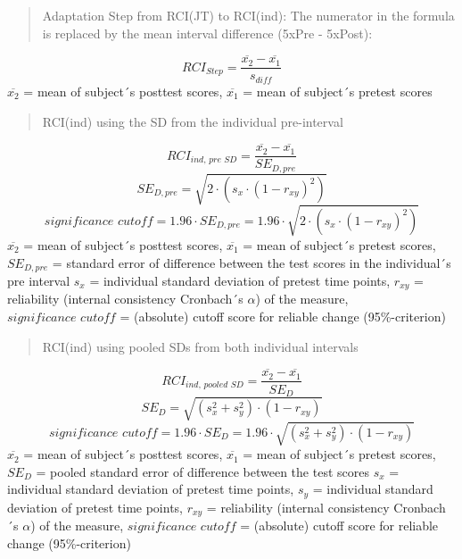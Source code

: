 \documentclass[12pt,twoside]{reedthesis}
\begin{document}
\par
\begin{quote}
Adaptation Step from RCI(JT) to RCI(ind): The numerator in the formula is replaced by the mean interval difference (5xPre - 5xPost):
\end{quote}
\begin{equation}
RCI_{Step} = \frac{\overline{x_{2}} - \overline{x_{1}}}  {s_{diff}} \label{eq:rci-step}
\end{equation}
\(\overline{x_{2}}\) = mean of subject´s posttest scores,
\(\overline{x_{1}}\) = mean of subject´s pretest scores
\begin{quote}
RCI(ind) using the SD from the individual pre-interval
\end{quote}
\begin{equation}
RCI_{\textit{ind, pre SD}} = \frac{\overline{x_{2}} - \overline{x_{1}}}  {SE_{D,pre}} \label{eq:rci-ind-presd}
\end{equation}
\begin{equation}
SE_{D,pre} = \sqrt{2 \cdot (s_{x} \cdot (1 - r_{xy})^2)} \label{eq:rci-ind-presd-se}
\end{equation}
\begin{equation}
\textit{significance cutoff} = 1.96 \cdot SE_{D,pre} = 1.96 \cdot \sqrt{2 \cdot (s_{x} \cdot (1 - r_{xy})^2)} \label{eq:rci-ind-presd-cut}
\end{equation}
\(\overline{x_{2}}\) = mean of subject´s posttest scores,
\(\overline{x_{1}}\) = mean of subject´s pretest scores,
\(SE_{D,pre}\) = standard error of difference between the test scores in the individual´s pre interval
\(s_{x}\) = individual standard deviation of pretest time points,
\(r_{xy}\) = reliability (internal consistency Cronbach´s \(\alpha\)) of the measure,
\(\textit{significance cutoff}\) = (absolute) cutoff score for reliable change (95\%-criterion)
\begin{quote}
RCI(ind) using pooled SDs from both individual intervals
\end{quote}
\begin{equation}
RCI_{\textit{ind, pooled SD}} = \frac{\overline{x_{2}} - \overline{x_{1}}}  {SE_{D}} \label{eq:rci-ind-pooledsd}
\end{equation}
\begin{equation}
SE_{D} = \sqrt{(s_{x}^2 + s_{y}^2) \cdot (1 - r_{xy})} \label{eq:rci-ind-pooledsd-se}
\end{equation}
\begin{equation}
\textit{significance cutoff} = 1.96 \cdot SE_{D} = 1.96 \cdot \sqrt{(s_{x}^2 + s_{y}^2) \cdot (1 - r_{xy})} \label{eq:rci-ind-pooledsd-cut}
\end{equation}
\(\overline{x_{2}}\) = mean of subject´s posttest scores,
\(\overline{x_{1}}\) = mean of subject´s pretest scores,
\(SE_{D}\) = pooled standard error of difference between the test scores
\(s_{x}\) = individual standard deviation of pretest time points,
\(s_{y}\) = individual standard deviation of pretest time points,
\(r_{xy}\) = reliability (internal consistency Cronbach´s \(\alpha\)) of the measure,
\(\textit{significance cutoff}\) = (absolute) cutoff score for reliable change (95\%-criterion)
\end{document}
